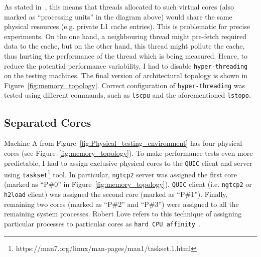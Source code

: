 \documentclass[12pt,a4paper,twoside,openright]{report}
\begin{document}
As stated in~\cite{hyperthreading_book}, this means that threads allocated to such virtual cores (also marked as \enquote{processing units} in the diagram above) would share the same physical resources (e.g. private L1 cache entries).
This is problematic for precise experiments.
On the one hand, a neighbouring thread might pre-fetch required data to the cache, but on the other hand, this thread might pollute the cache, thus hurting the performance of the thread which is being measured.
Hence, to reduce the potential performance variability, I had to disable \texttt{hyper-threading} on the testing machines.
The final version of architectural topology is shown in Figure~\ref{fig:memory_topology}. 
Correct configuration of \texttt{hyper-threading} was tested using different commands, such as \texttt{lscpu} and the aforementioned \texttt{lstopo}. 

    
    
\subsection{Separated Cores} \label{SeparatedCores_Subsection_Tag}
Machine A from Figure~\ref{fig:Physical_testing_environment} has four physical cores (see Figure~\ref{fig:memory_topology}).
To make performance tests even more predictable, I had to assign exclusive physical cores to the \texttt{QUIC} client and server using \texttt{taskset}\footnote{https://man7.org/linux/man-pages/man1/taskset.1.html} tool.
In particular, \texttt{ngtcp2} server was assigned the first core (marked as \enquote{P\#0} in Figure~\ref{fig:memory_topology}).
\texttt{QUIC} client (i.e. \texttt{ngtcp2} or \texttt{h2load} client) was assigned the second core (marked as \enquote{P\#1}).
Finally, remaining two cores (marked as \enquote{P\#2} and \enquote{P\#3}) were assigned to all the remaining system processes.
Robert Love refers to this technique of assigning particular processes to particular cores as \texttt{hard CPU affinity}~\cite{CPU_Affinity}.
\end{document}
